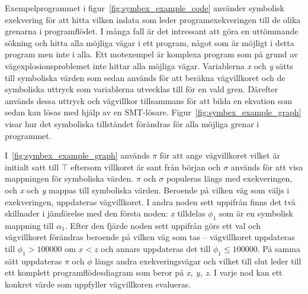 Exempelprogrammet i figur~\ref{fig:symbex_example_code} använder symbolisk
exekvering för att hitta vilken indata som leder programexekveringen till de
olika grenarna i programflödet. I många fall är det intressant att göra en
uttömmande sökning och hitta alla möjliga vägar i ett program, något som är
möjligt i detta program men inte i alla. Ett motexempel är komplexa
program som på grund av vägexplosionsproblemet inte hittar alla möjliga vägar.
Variablerna \emph{x} och \emph{y} sätts till symboliska värden som sedan används
för att beräkna vägvillkoret och de symboliska uttryck som variablerna utvecklas
till för en vald gren. Därefter används dessa uttryck och vägvillkor
tillsammans för att bilda en ekvation som sedan kan lösas med hjälp av en SMT-lösare.
Figur~\ref{fig:symbex_example_graph} visar
hur det symboliska tillståndet förändras för alla möjliga grenar i programmet.

I~\ref{fig:symbex_example_graph} används $\pi$ för att ange vägvillkoret vilket
är initialt satt till $\top$ eftersom villkoret är sant från början och $\sigma$
används för att visa mappningen för symboliska värden. $\pi$ och $\sigma$ %
populeras längs med exekveringen, och \emph{x} och \emph{y} mappas till
symboliska värden. Beroende på vilken väg som väljs i exekveringen, uppdateras
vägvillkoret. I andra noden sett uppifrån finns det två skillnader i jämförelse
med den första noden: \emph{x} tilldelas $\phi_1$ som är en symbolisk mappning
till $\alpha_1$. Efter den fjärde noden sett uppifrån görs ett val och
vägvillkoret förändras beroende på vilken väg som tas -- vägvillkoret uppdateras
till $\phi_1 > 100000$ om $x < z$ och annars uppdateras det till $\phi_1 \leq
    100000$. På samma sätt uppdateras $\pi$ och $\phi$ längs andra exekveringsvägar
och vilket till slut leder till ett komplett programflödesdiagram som beror på
\emph{x, y, z}. I varje nod kan ett konkret värde som uppfyller vägvillkoren evalueras.
